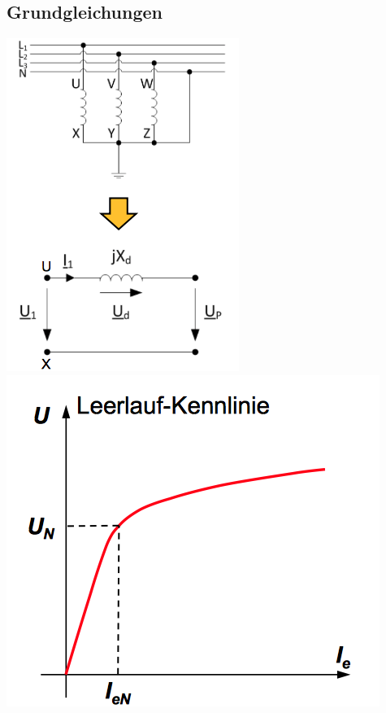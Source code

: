 \subsection{Grundgleichungen}
\begin{minipage}{0.4 \linewidth}
\includegraphics[width = \linewidth]{./Pics/VL910/Grundgleichung}
\includegraphics[width = \linewidth]{./Pics/VL910/leerlaufk}

\end{minipage}
